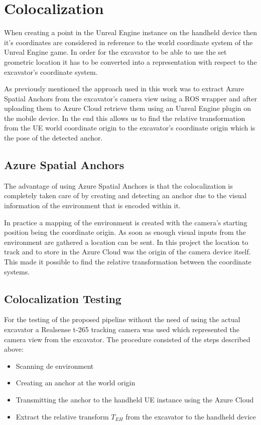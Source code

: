 \chapter{Colocalization}\label{ch:colocalization}

When creating a point in the Unreal Engine instance on the handheld device then it's coordinates are considered in reference to the world coordinate system of the Unreal Engine game. In order for the excavator to be able to use the set geometric location it has to be converted into a representation with respect to the excavator's coordinate system.

As previously mentioned the approach used in this work was to extract Azure Spatial Anchors from the excavator's camera view using a ROS wrapper and after uploading them to Azure Cloud retrieve them using an Unreal Engine plugin on the mobile device. In the end this allows us to find the relative transformation from the UE world coordinate origin to the excavator's coordinate origin which is the pose of the detected anchor.

\section{Azure Spatial Anchors}\label{sec:azure_spatial_anchors}

The advantage of using Azure Spatial Anchors is that the colocalization is completely taken care of by creating and detecting an anchor due to the visual information of the environment that is encoded within it.

In practice a mapping of the environment is created with the camera's starting position being the coordinate origin. As soon as enough visual inputs from the environment are gathered a location can be sent. In this project the location to track and to store in the Azure Cloud was the origin of the camera device itself. This made it possible to find the relative transformation between the coordinate systems.

\section{Colocalization Testing}\label{sec:colocalization_testing}

For the testing of the proposed pipeline without the need of using the actual excavator a Realsense t-265 tracking camera was used which represented the camera view from the excavator. The procedure consisted of the steps described above:
\begin{itemize}
    \item Scanning de environment
    \item Creating an anchor at the world origin
    \item Transmitting the anchor to the handheld UE instance using the Azure Cloud
    \item Extract the relative transform $T_{EH}$ from the excavator to the handheld device
\end{itemize}

